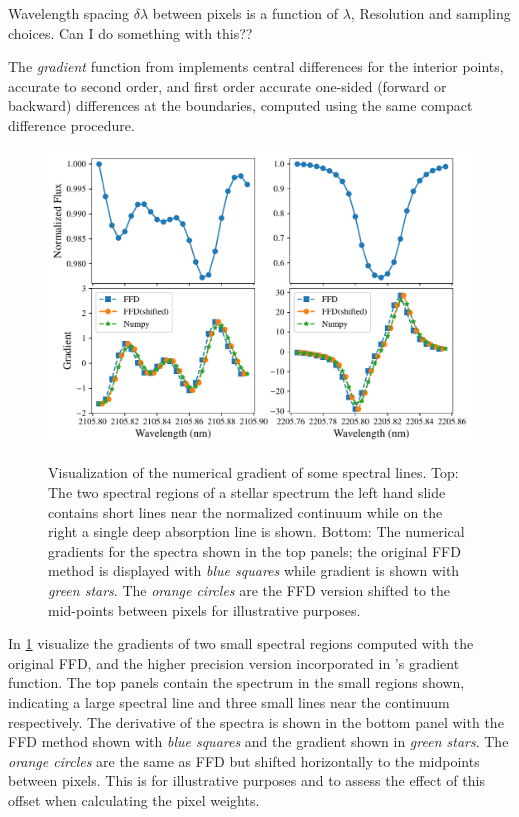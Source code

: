 {\red{} Wavelength spacing \(\delta\lambda\) between pixels is a function of \(\lambda\), Resolution and sampling choices.
    Can I do something with this??}

The \emph{gradient} function from \numpy{} implements central differences for the interior points, accurate to second order, and first order accurate one-sided (forward or backward) differences at the boundaries, computed using the same compact difference procedure.

\begin{figure}
    \centering
    \includegraphics[width=0.8\linewidth]{figures/information-content/spectral_gradients}\\
    \caption[Comparing of numerical gradient alogithms.]{Visualization of the numerical gradient of some spectral lines.
        Top: The two spectral regions of a stellar spectrum the left hand slide contains short lines near the normalized continuum while on the right a single deep absorption line is shown.
        Bottom: The numerical gradients for the spectra shown in the top panels; the original {FFD} method is displayed with \emph{blue squares} while \numpy{} gradient is shown with \emph{green stars}.
        The \emph{orange circles} are the {FFD} version shifted to the mid-points between pixels for illustrative purposes.}
    \label{fig:gradients}
\end{figure}




In \cref{fig:gradients}  visualize the gradients of two small spectral regions computed with the original {FFD}, and the higher precision version incorporated in \numpy{}'s gradient function.
The top panels contain the spectrum in the small regions shown, indicating a large spectral line and three small lines near the continuum respectively.
The derivative of the spectra is shown in the bottom panel with the {FFD} method shown with \emph{blue squares} and the \numpy{} gradient shown in \emph{green stars}.
The \emph{orange circles} are the same as {FFD} but shifted horizontally to the midpoints between pixels.
This is for illustrative purposes and to assess the effect of this offset when calculating the pixel weights.

